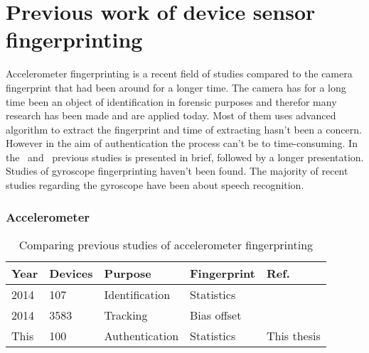 \section{Previous work of device sensor fingerprinting}
Accelerometer fingerprinting is a recent field of studies compared to the camera fingerprint that had been around for a longer time. The camera has for a long time been an object of identification in forensic purposes and therefor many research has been made and are applied today. Most of them uses advanced algorithm to extract the fingerprint and time of extracting hasn't been a concern. However in the aim of authentication the process can't be to time-consuming. In the~ and~ previous studies is presented in brief, followed by a longer presentation. Studies of gyroscope fingerprinting haven't been found. The majority of recent studies regarding the gyroscope have been about speech recognition. \cite{sensor:speechGyro} 
\begin{table}[H]
\subsubsection*{Accelerometer}
\begin{tabular}{| p{1cm} | p{1cm} | p{2.5cm} | p{1.8cm} | p{3.5cm} |}
  Year & Devices & Purpose & Fingerprint & Ref. \\ \hline
  2014 & 107 & Identification & Statistics &~\cite{sensor:accelPrint} \\
  2014 & 3583 & Tracking & Bias offset &~\cite{sensor:micSpeak} \\
  This & 100 & Authentication & Statistics & This thesis \\ \hline
\end{tabular} 
\caption[Table caption text]{Comparing previous studies of accelerometer fingerprinting} \label{table:prevAcc}
\end{table}
